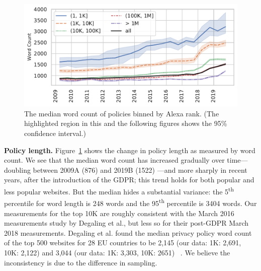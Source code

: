 \begin{figure}[t]
\centering
\includegraphics[width=0.99\columnwidth]{figures/word-count-by-rank.pdf}
\caption{The median word count of policies binned by Alexa rank. (The highlighted region in this and the following figures shows the 95\% confidence interval.)}
\label{fig:wordcount}
\end{figure}

\newcommand{\medianWCStartAlexa}{876}
\newcommand{\medianWCEnd}{1522}


{\bf Policy length.} Figure~\ref{fig:wordcount} shows the change in policy length as measured by word count. We see that the median word count has increased gradually over time---doubling between 2009A (\medianWCStartAlexa) and 2019B (\medianWCEnd) ---and more sharply in recent years, after the introduction of the GDPR; this trend holds for both popular and less popular websites. But the median hides a substantial variance: the 5\textsuperscript{th} percentile for word length is 248 words and the 95\textsuperscript{th} percentile is 3404 words. 
Our measurements for the top 10K are roughly consistent with the March 2016 measurements study by Degaling et al., but less so for their post-GDPR March 2018 measurements. Degaling et al. found the median privacy policy word count of the top 500 websites for 28 EU countries to be 2,145 (our data: 1K: 2,691, 10K: 2,122) and 3,044 (our data: 1K: 3,303, 10K: 2651) ~\cite{degeling2018we}. We believe the inconsistency is due to the difference in sampling.

